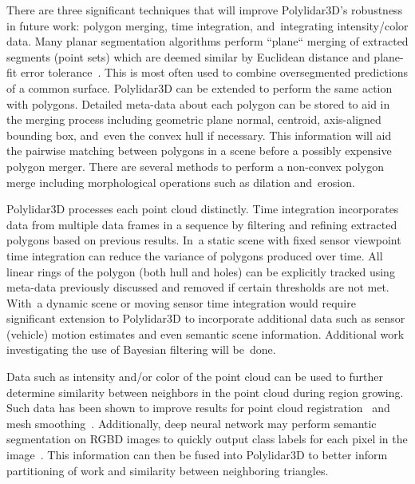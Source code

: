 There are three significant techniques that will improve Polylidar3D's robustness in future work: polygon merging, time integration, and~integrating intensity/color data. Many planar segmentation algorithms perform ``plane`` merging of extracted segments (point sets) which are deemed similar by Euclidean distance and plane-fit error tolerance~\cite{feng_fast_2014,oesau_planar_2016, trevor2013efficient, biswas_planar_2012}. This is most often used to combine oversegmented predictions of a common surface. Polylidar3D can be extended to perform the same action with polygons. Detailed meta-data about each polygon can be stored to aid in the merging process including geometric plane normal, centroid, axis-aligned bounding box, and~even the convex hull if necessary. This information will aid the pairwise matching between polygons in a scene before a possibly expensive polygon merger. There are several methods to perform a non-convex polygon merge including morphological operations such as dilation and~erosion.

Polylidar3D processes each point cloud distinctly. Time integration incorporates data from multiple data frames in a sequence by filtering and refining extracted polygons based on previous results. In~a static scene with fixed sensor viewpoint time integration can reduce the variance of polygons produced over time. All linear rings of the polygon (both hull and holes) can be explicitly tracked using meta-data previously discussed and removed if certain thresholds are not met.  With~a dynamic scene or moving sensor time integration would require significant extension to Polylidar3D to incorporate additional data such as sensor (vehicle) motion estimates and even semantic scene information. Additional work investigating the use of Bayesian filtering will be~done.

Data such as intensity and/or color of the point cloud can be used to further determine similarity between neighbors in the point cloud during region growing. Such data has been shown to improve results for point cloud registration~\cite{rusinkiewicz_efficient_2001} and mesh smoothing~\cite{lee_fast_2013}. Additionally, deep neural network may perform semantic segmentation on \ac{RGBD} images to quickly output class labels for each pixel in the image~\cite{pham_scenecut_2018}. This information can then be fused into Polylidar3D to better inform partitioning of work and similarity between neighboring triangles.

